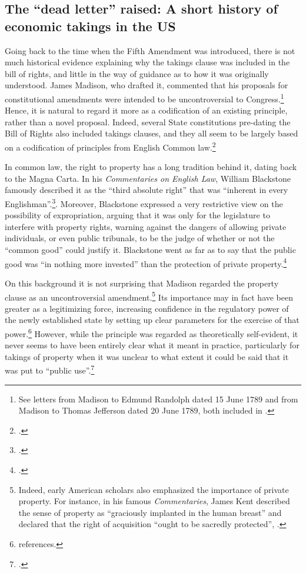 \subsection{The ``dead letter'' raised: A short history of economic takings in the US}

Going back to the time when the Fifth Amendment was introduced, there is not much historical evidence explaining why the takings clause was included in the bill of rights, and little in the way of guidance as to how it was originally understood. James Madison, who drafted it, commented that his proposals for constitutional amendments were intended to be uncontroversial to Congress.\footnote{See letters from Madison to Edmund Randolph dated 15 June 1789 and from Madison to Thomas Jefferson dated 20 June 1789, both included in \cite{madison79}.}  Hence, it is natural to regard it more as a codification of an existing principle, rather than a novel proposal. Indeed, several State constitutions pre-dating the Bill of Rights also included takings clauses, and they all seem to be largely based on a codification of principles from English Common law.\footcite[See][299]{johnson11}

In common law, the right to property has a long tradition behind it, dating back to the Magna Carta. In his {\it Commentaries on English Law}, William Blackstone famously described it as the ``third absolute right'' that was ``inherent in every Englishman''.\footcite[134-135]{blackstone79}.  Moreover, Blackstone expressed a very restrictive view on the possibility of expropriation, arguing that it was only for the legislature to interfere with property rights, warning against the dangers of allowing private individuals, or even public tribunals, to be the judge of whether or not the ``common good'' could justify it. Blackstone went as far as to say that the public good was ``in nothing more invested'' than the protection of private property.\footcite[134-135]{blackstone79}

On this background it is not surprising that Madison regarded the property clause as an uncontroversial amendment.\footnote{Indeed, early American scholars also emphasized the importance of private property. For instance, in his famous {\it Commentaries}, James Kent described the sense of property as ``graciously implanted in the human breast'' and declared that the right of acquisition ``ought to be sacredly protected'', \cite[see][257]{kent27}.} Its importance may in fact have been greater as a legitimizing force, increasing confidence in the regulatory power of the newly established state by setting up clear parameters for the exercise of that power.\footnote{references.}  However, while the principle was regarded as theoretically self-evident, it never seems to have been entirely clear what it meant in practice, particularly for takings of property when it was unclear to what extent it could be said that it was put to ``public use''.\footcite[See][317]{johnson11} 

